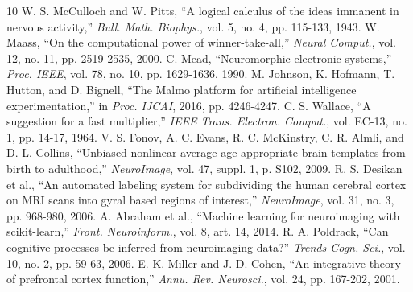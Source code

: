\documentclass[conference]{IEEEtran}
\begin{document}
\begin{thebibliography}{10}
 W. S. McCulloch and W. Pitts, ``A logical calculus of the ideas immanent in nervous activity,'' \emph{Bull. Math. Biophys.}, vol. 5, no. 4, pp. 115-133, 1943.
 W. Maass, ``On the computational power of winner-take-all,'' \emph{Neural Comput.}, vol. 12, no. 11, pp. 2519-2535, 2000.
 C. Mead, ``Neuromorphic electronic systems,'' \emph{Proc. IEEE}, vol. 78, no. 10, pp. 1629-1636, 1990.
 M. Johnson, K. Hofmann, T. Hutton, and D. Bignell, ``The Malmo platform for artificial intelligence experimentation,'' in \emph{Proc. IJCAI}, 2016, pp. 4246-4247.
 C. S. Wallace, ``A suggestion for a fast multiplier,'' \emph{IEEE Trans. Electron. Comput.}, vol. EC-13, no. 1, pp. 14-17, 1964.
 V. S. Fonov, A. C. Evans, R. C. McKinstry, C. R. Almli, and D. L. Collins, ``Unbiased nonlinear average age-appropriate brain templates from birth to adulthood,'' \emph{NeuroImage}, vol. 47, suppl. 1, p. S102, 2009.
 R. S. Desikan et al., ``An automated labeling system for subdividing the human cerebral cortex on MRI scans into gyral based regions of interest,'' \emph{NeuroImage}, vol. 31, no. 3, pp. 968-980, 2006.
 A. Abraham et al., ``Machine learning for neuroimaging with scikit-learn,'' \emph{Front. Neuroinform.}, vol. 8, art. 14, 2014.
 R. A. Poldrack, ``Can cognitive processes be inferred from neuroimaging data?'' \emph{Trends Cogn. Sci.}, vol. 10, no. 2, pp. 59-63, 2006.
 E. K. Miller and J. D. Cohen, ``An integrative theory of prefrontal cortex function,'' \emph{Annu. Rev. Neurosci.}, vol. 24, pp. 167-202, 2001.
\end{thebibliography}
\end{document}
